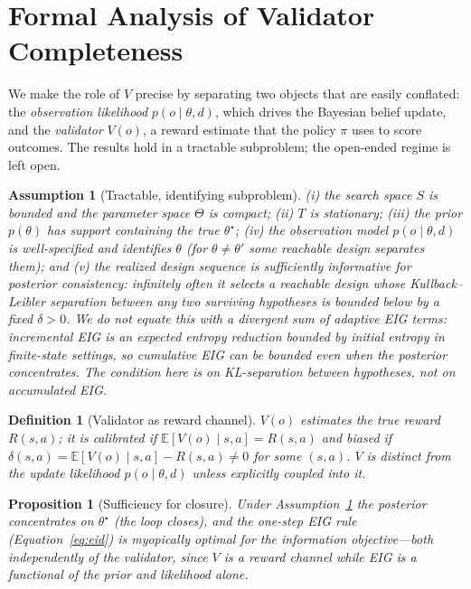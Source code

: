 \documentclass{article}
\newtheorem{proposition}{Proposition}
\newtheorem{definition}{Definition}
\newtheorem{assumption}{Assumption}
\begin{document}
\appendix
\section{Formal Analysis of Validator Completeness}
\label{app:vformal}

We make the role of $V$ precise by separating two objects that are easily conflated: the \emph{observation likelihood} $p(o \mid \theta, d)$, which drives the Bayesian belief update, and the \emph{validator} $V(o)$, a reward estimate that the policy $\pi$ uses to score outcomes. The results hold in a tractable subproblem; the open-ended regime is left open.

\begin{assumption}[Tractable, identifying subproblem]
\label{asm:tract}
(i) the search space $S$ is bounded and the parameter space $\Theta$ is compact; (ii) $T$ is stationary; (iii) the prior $p(\theta)$ has support containing the true $\theta^\star$; (iv) the observation model $p(o \mid \theta, d)$ is well-specified and identifies $\theta$ (for $\theta \neq \theta'$ some reachable design separates them); and (v) the realized design sequence is \emph{sufficiently informative} for posterior consistency: infinitely often it selects a reachable design whose Kullback--Leibler separation between any two surviving hypotheses is bounded below by a fixed $\delta>0$. We do not equate this with a divergent sum of adaptive EIG terms: incremental EIG is an expected entropy reduction bounded by initial entropy in finite-state settings, so cumulative EIG can be bounded even when the posterior concentrates. The condition here is on KL-separation between hypotheses, not on accumulated EIG.
\end{assumption}

\begin{definition}[Validator as reward channel]
\label{def:channel}
$V(o)$ estimates the true reward $R(s,a)$; it is \emph{calibrated} if $\mathbb{E}[V(o) \mid s,a] = R(s,a)$ and \emph{biased} if $\delta(s,a) = \mathbb{E}[V(o) \mid s,a] - R(s,a) \neq 0$ for some $(s,a)$. $V$ is distinct from the update likelihood $p(o \mid \theta, d)$ unless explicitly coupled into it.
\end{definition}

\begin{proposition}[Sufficiency for closure]
\label{prop:suff}
Under Assumption~\ref{asm:tract} the posterior concentrates on $\theta^\star$ (the loop closes), and the one-step EIG rule (Equation~\ref{eq:eid}) is myopically optimal for the information objective---both independently of the validator, since $V$ is a reward channel while EIG is a functional of the prior and likelihood alone.
\end{proposition}
\end{document}
